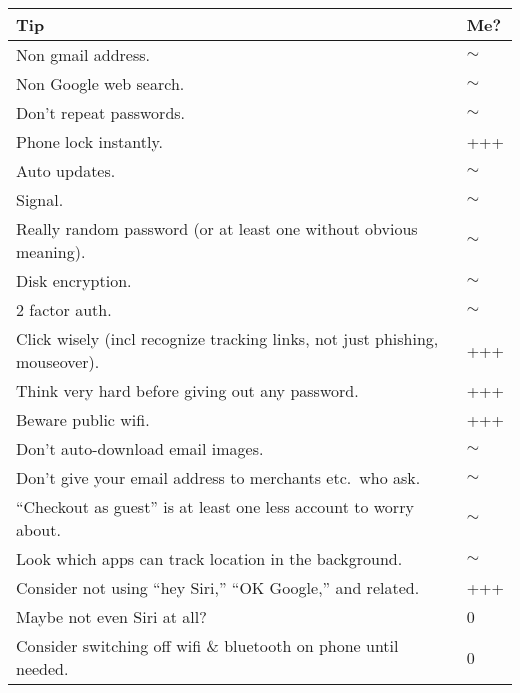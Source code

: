 \documentclass{tufte-handout}
\begin{document}
\begin{tabular}{p{5in}l}
\hline
\textbf{Tip} & \textbf{Me?} \\
\hline

Non gmail address. & $\sim$ \\

Non Google web search. & $\sim$ \\

Don't repeat passwords. & $\sim$ \\

Phone lock instantly. & +++ \\

Auto updates. & $\sim$ \\

Signal. & $\sim$ \\

Really random password (or at least one without obvious meaning). & $\sim$ \\

Disk encryption. & $\sim$ \\

2 factor auth. & $\sim$ \\

Click wisely (incl recognize tracking links, not just phishing, mouseover). & +++ \\

Think very hard before giving out any password. & +++ \\

Beware public wifi. & +++ \\

Don't auto-download email images. & $\sim$ \\

Don't give your email address to merchants etc.\ who ask. & $\sim$ \\

``Checkout as guest'' is at least one less account to worry about. & $\sim$ \\

Look which apps can track location in the background. & $\sim$ \\

Consider not using ``hey Siri,'' ``OK Google,'' and related. & +++ \\

Maybe not even Siri at all? & 0 \\

Consider switching off wifi \& bluetooth on phone until needed. & 0 \\


\end{tabular}
\end{document}
